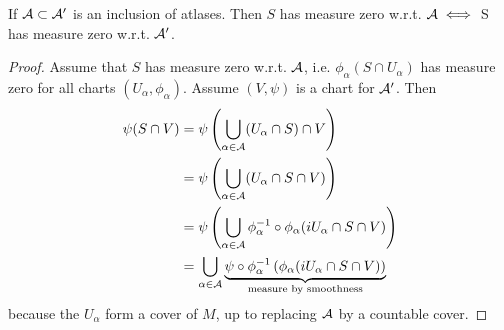 \begin{lemma}\label{lem:6.7}
    If \(\mathcal{A}\subset\mathcal{A}'\) is an inclusion of atlases. Then \(S\) has measure zero w.r.t. \(\mathcal{A}\iff\) S has measure zero w.r.t. \(\mathcal{A}'\).
\end{lemma}

\begin{proof}
    Assume that \(S\) has measure zero w.r.t. \(\mathcal{A}\), i.e. \(\phi_\alpha(S\cap U_\alpha)\) has measure zero for all charts 
    \((U_\alpha,\phi_\alpha)\). Assume \((V,\psi)\) is a chart for \(\mathcal{A}'\). Then 
    \begin{align*}
        \psi(S\cap V)&=\psi\left(\bigcup_{\alpha\in\mathcal{A}} (U_\alpha\cap S)\cap V\right)\\
                     &=\psi\left(\bigcup_{\alpha\in\mathcal{A}} (U_\alpha\cap S\cap V)\right)\\
                     &=\psi\left(\bigcup_{\alpha\in\mathcal{A}} \phi_\alpha^{-1}\circ \phi_\alpha (iU_\alpha\cap S\cap V)\right)\\
                     &=\bigcup_{\alpha\in\mathcal{A}} \underbrace{\psi\circ\phi_\alpha^{-1}\left( \phi_\alpha (iU_\alpha\cap S\cap V)\right)}_{\text{measure by smoothness}}
    \end{align*}
    because the \(U_\alpha\) form a cover of \(M\), up to replacing \(\mathcal{A}\) by a countable cover.
\end{proof}


